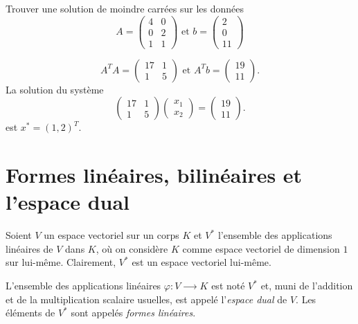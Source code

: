 \begin{example}
\label{exe:4}
Trouver une solution de moindre carrées sur les données 
\begin{displaymath}
  A =
  \begin{pmatrix}
    4 & 0 \\ 0 &2 \\ 1 & 1
  \end{pmatrix}
\text{ et }  b =
\begin{pmatrix}
  2\\0\\11
\end{pmatrix}
\end{displaymath}  

\begin{displaymath}
  A^T A =
  \begin{pmatrix}
    17 & 1 \\
    1 & 5
  \end{pmatrix} \text{ et } A^T b =
  \begin{pmatrix}
    19 \\ 11
  \end{pmatrix}. 
\end{displaymath}
La solution du système 
\begin{displaymath}
   \begin{pmatrix}
    17 & 1 \\
    1 & 5
  \end{pmatrix}
  \begin{pmatrix}
    x_1\\x_2
  \end{pmatrix}
= \begin{pmatrix}
    19 \\ 11
  \end{pmatrix}.
\end{displaymath}
est $x^* = (1,2)^T$. 
\end{example}








\section{Formes linéaires, bilinéaires et l'espace dual}
\label{sec:lespace-dual}

Soient $V$ un espace vectoriel sur un corps $K$ et $V^*$ l'ensemble  des  applications linéaires de $V$ dans $K$, où on considère $K$ comme espace vectoriel de dimension $1$ sur lui-même. Clairement, $V^*$ est un espace vectoriel lui-même. 
\begin{definition}
\label{def:9}
  L'ensemble des  applications linéaires  $φ : V ⟶ K$ est noté $V^*$ et, muni de l'addition et de la multiplication scalaire usuelles, est appelé l'\emph{espace dual} de $V$. Les éléments de $V^*$ sont appelés \emph{formes linéaires}.
\end{definition}

